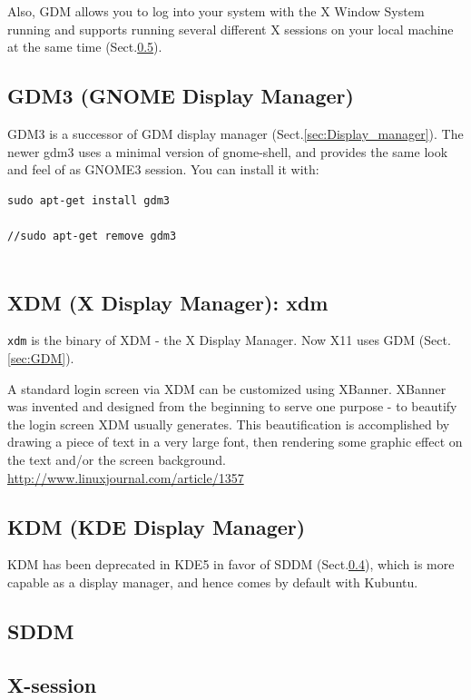 Also, GDM allows you to log into your system with the X Window System running
and supports running several different X sessions on your local machine at the
same time (Sect.\ref{sec:X-session}).

\subsection{GDM3 (GNOME Display Manager)}
\label{sec:GDM3}

GDM3 is a successor of GDM display manager (Sect.\ref{sec:Display_manager}).
The newer gdm3 uses a minimal version of gnome-shell, and provides the same look
and feel of as GNOME3 session. You can install it with:
\begin{verbatim}
sudo apt-get install gdm3

//sudo apt-get remove gdm3


\end{verbatim}


\subsection{XDM (X Display Manager): xdm}
\label{sec:xdm}

\verb!xdm! is the binary of XDM - the X Display Manager.
Now X11 uses GDM (Sect.\ref{sec:GDM}). 


A standard login screen via XDM can be customized using XBanner.
XBanner was invented and designed from the beginning to serve one purpose - to
beautify the login screen XDM usually generates. This beautification is
accomplished by drawing a piece of text in a very large font, then rendering
some graphic effect on the text and/or the screen background.
\url{http://www.linuxjournal.com/article/1357}


\subsection{KDM (KDE Display Manager)}
\label{sec:KDM}


KDM has been deprecated in KDE5 in favor of SDDM (Sect.\ref{sec:SDDM}), which is
more capable as a display manager, and hence comes by default with Kubuntu.

\subsection{SDDM}
\label{sec:SDDM}




\subsection{X-session}
\label{sec:X-session}




